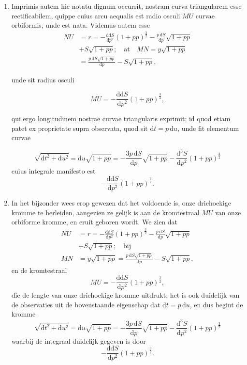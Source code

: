 \documentclass[10pt,a4paper]{article}
\newcommand{\switchenum}{\setcounter{enumi}{\arabic{enumi}-1}\switchcolumn}
\def\D{\mathrm{d}}
\begin{document}
\begin{paracol}{2}
\begin{enumerate}[topsep=1px]
		\switchcolumn*
		
		\item Imprimis autem hic notatu dignum occurrit, nostram curva triangularem esse rectificabilem, quippe cuius arcu aequalis est radio osculi $MU$ curvae orbiformis, unde est nata. Videmus autem esse
		\begin{align*}
			NU &= r = -\frac{\D \D S}{\D p^2}(1+pp)^\frac{3}{2}-\frac{p\,\D S}{\D p}\sqrt{1+pp}\\
			& +S\sqrt{1+pp}; \quad \text{at} \quad MN = y\sqrt{1+pp}\\
			&= \frac{p\, \D S\sqrt{1+pp}}{\D p}-S\sqrt{1+pp},
		\end{align*}
		
		unde sit radius osculi
		
		\[
			MU = -\frac{\D \D S}{\D p^2}(1+pp)^\frac{3}{2},
		\]
		\par qui ergo longitudinem nostrae curvae triangularis exprimit; id quod etiam patet ex proprietate supra observata, quod sit $\D t = p\, \D u$, unde fit elementum curvae
		
		\[
			\sqrt{\D t^2+\D u^2} = \D u\sqrt{1+pp} = -\frac{3p\, \D S}{\D p}\sqrt{1+pp}-\frac{\D^3S}{\D p^2}(1+pp)^\frac{3}{2}
		\]
		cuius integrale manifesto est
		\[
			-\frac{\D \D S}{\D p^2}(1+pp)^\frac{3}{2}.
		\]
		
		\switchenum
		\item In het bijzonder wees erop gewezen dat het voldoende is, onze driehoekige kromme te herleiden, aangezien ze gelijk is aan de kromtestraal $MU$ van onze orbiforme kromme, en eruit geboren wordt. We zien dat
		\begin{align*}
			NU &= r = -\frac{\D \D S}{\D p^2}(1+pp)^\frac{3}{2}-\frac{p\,\D S}{\D p}\sqrt{1+pp}\\
			& +S\sqrt{1+pp}; \quad \text{bij}\\
			MN & = y\sqrt{1+pp} = \frac{p\, \D S\sqrt{1+pp}}{\D p}-S\sqrt{1+pp},
		\end{align*}
		en de kromtestraal
		\[
			MU = -\frac{\D \D S}{\D p^2}(1+pp)^\frac{3}{2},
		\]
		die de lengte van onze driehoekige kromme uitdrukt; het is ook duidelijk van de observaties uit de bovenstaande eigenschap dat $\D t = p\, \D u$, en dus begint de kromme 
		\[
			\sqrt{\D t^2+\D u^2} = \D u\sqrt{1+pp} = -\frac{3p\, \D S}{\D p}\sqrt{1+pp}-\frac{\D^3S}{\D p^2}(1+pp)^\frac{3}{2}
		\]
		waarbij de integraal duidelijk gegeven is door
		\[
			-\frac{\D \D S}{\D p^2}(1+pp)^\frac{3}{2}.
		\]
		
		\switchcolumn*
		

\end{enumerate}
\end{paracol}
\end{document}
